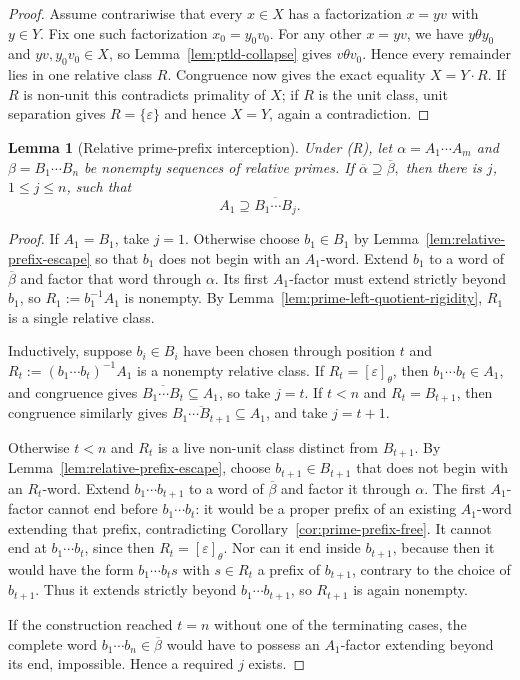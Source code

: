 \documentclass[11pt,a4paper]{article}
\newtheorem{lemma}[theorem]{Lemma}
\newcommand{\eps}{\varepsilon}
\begin{document}
\begin{proof}
Assume contrariwise that every $x\in X$ has a factorization $x=yv$ with $y\in Y$.  Fix one such factorization $x_0=y_0v_0$.  For any other $x=yv$, we have $y\theta y_0$ and $yv,y_0v_0\in X$, so Lemma~\ref{lem:ptld-collapse} gives $v\theta v_0$.  Hence every remainder lies in one relative class $R$.  Congruence now gives the exact equality $X=Y\cdot R$.  If $R$ is non-unit this contradicts primality of $X$; if $R$ is the unit class, unit separation gives $R=\{\eps\}$ and hence $X=Y$, again a contradiction.
\end{proof}

\begin{lemma}[Relative prime-prefix interception]
\label{lem:prefix-interception}
Under \textup{(R)}, let
\(\alpha=A_1\cdots A_m\) and \(\beta=B_1\cdots B_n\)
be nonempty sequences of relative primes.  If
\(\overline\alpha\supseteq\overline\beta,\)
then there is $j$, $1\le j\le n$, such that
\[
  A_1\supseteq\overline{B_1\cdots B_j}.
\]
\end{lemma}

\begin{proof}
If $A_1=B_1$, take $j=1$.  Otherwise choose $b_1\in B_1$ by Lemma~\ref{lem:relative-prefix-escape} so that $b_1$ does not begin with an $A_1$-word.  Extend $b_1$ to a word of $\overline\beta$ and factor that word through $\alpha$.  Its first $A_1$-factor must extend strictly beyond $b_1$, so $R_1:=b_1^{-1}A_1$ is nonempty.  By Lemma~\ref{lem:prime-left-quotient-rigidity}, $R_1$ is a single relative class.

Inductively, suppose $b_i\in B_i$ have been chosen through position $t$ and $R_t:=(b_1\cdots b_t)^{-1}A_1$ is a nonempty relative class.  If $R_t=[\eps]_\theta$, then $b_1\cdots b_t\in A_1$, and congruence gives $\overline{B_1\cdots B_t}\subseteq A_1$, so take $j=t$.  If $t<n$ and $R_t=B_{t+1}$, then congruence similarly gives $\overline{B_1\cdots B_{t+1}}\subseteq A_1$, and take $j=t+1$.

Otherwise $t<n$ and $R_t$ is a live non-unit class distinct from $B_{t+1}$.  By Lemma~\ref{lem:relative-prefix-escape}, choose $b_{t+1}\in B_{t+1}$ that does not begin with an $R_t$-word.  Extend $b_1\cdots b_{t+1}$ to a word of $\overline\beta$ and factor it through $\alpha$.  The first $A_1$-factor cannot end before $b_1\cdots b_t$: it would be a proper prefix of an existing $A_1$-word extending that prefix, contradicting Corollary~\ref{cor:prime-prefix-free}.  It cannot end at $b_1\cdots b_t$, since then $R_t=[\eps]_\theta$.  Nor can it end inside $b_{t+1}$, because then it would have the form $b_1\cdots b_ts$ with $s\in R_t$ a prefix of $b_{t+1}$, contrary to the choice of $b_{t+1}$.  Thus it extends strictly beyond $b_1\cdots b_{t+1}$, so $R_{t+1}$ is again nonempty.

If the construction reached $t=n$ without one of the terminating cases, the complete word $b_1\cdots b_n\in\overline\beta$ would have to possess an $A_1$-factor extending beyond its end, impossible.  Hence a required $j$ exists.
\end{proof}
\end{document}
